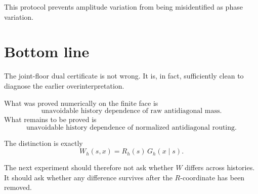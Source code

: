 \documentclass[11pt,a4paper]{article}
\begin{document}
This protocol prevents amplitude variation from being misidentified as phase
variation.

\section{Bottom line}

The joint-floor dual certificate is not wrong.  It is, in fact, sufficiently
clean to diagnose the earlier overinterpretation.

What was proved numerically on the finite face is
\[
\boxed{
\text{unavoidable history dependence of raw antidiagonal mass.}
}
\]
What remains to be proved is
\[
\boxed{
\text{unavoidable history dependence of normalized antidiagonal routing.}
}
\]

The distinction is exactly
\[
\boxed{
W_h(s,x)
=
R_h(s)\,G_h(x\mid s).
}
\]

The next experiment should therefore not ask whether \(W\) differs across
histories.  It should ask whether any difference survives after the
\(R\)-coordinate has been removed.
\end{document}
